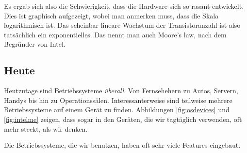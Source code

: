 \documentclass[ngerman,abstract=true]{scrartcl}
\begin{document}
Es ergab sich also die Schwierigkeit, dass die Hardware sich so rasant entwickelt. Dies ist graphisch aufgezeigt, wobei man anmerken muss, dass die Skala logarithmisch ist. Das scheinbar lineare Wachstum der Transistoranzahl ist also tatsächlich ein exponentielles. Das nennt man auch Moore's law, nach dem Begründer von Intel.

\subsection{Heute}

Heutzutage sind Betriebssysteme \emph{überall}. Von Fernsehehern zu Autos, Servern, Handys bis hin zu Operationssälen. Interessanterweise sind teilweise mehrere Betriebssysteme auf einem Gerät zu finden. Abbildungen \ref{fig:osdevices} und \ref{fig:intelme} zeigen, dass sogar in den Geräten, die wir tagtäglich verwenden, oft mehr steckt, als wir denken.

Die Betriebssysteme, die wir benutzen, haben oft sehr viele Features eingebaut. 
\end{document}
